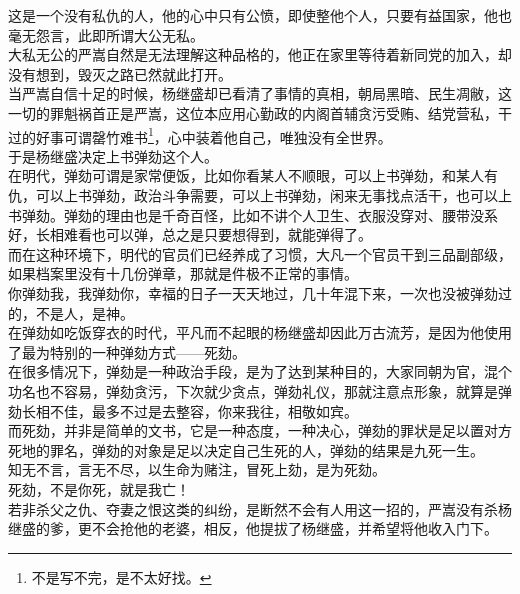 \begin{multicols}{\theparacolNo}
这是一个没有私仇的人，他的心中只有公愤，即使整他个人，只要有益国家，他也毫无怨言，此即所谓大公无私。\\

大私无公的严嵩自然是无法理解这种品格的，他正在家里等待着新同党的加入，却没有想到，毁灭之路已然就此打开。\\

当严嵩自信十足的时候，杨继盛却已看清了事情的真相，朝局黑暗、民生凋敝，这一切的罪魁祸首正是严嵩，这位本应用心勤政的内阁首辅贪污受贿、结党营私，干过的好事可谓罄竹难书\footnote{不是写不完，是不太好找。}，心中装着他自己，唯独没有全世界。\\

于是杨继盛决定上书弹劾这个人。\\

在明代，弹劾可谓是家常便饭，比如你看某人不顺眼，可以上书弹劾，和某人有仇，可以上书弹劾，政治斗争需要，可以上书弹劾，闲来无事找点活干，也可以上书弹劾。弹劾的理由也是千奇百怪，比如不讲个人卫生、衣服没穿对、腰带没系好，长相难看也可以弹，总之是只要想得到，就能弹得了。\\

而在这种环境下，明代的官员们已经养成了习惯，大凡一个官员干到三品副部级，如果档案里没有十几份弹章，那就是件极不正常的事情。\\

你弹劾我，我弹劾你，幸福的日子一天天地过，几十年混下来，一次也没被弹劾过的，不是人，是神。\\

在弹劾如吃饭穿衣的时代，平凡而不起眼的杨继盛却因此万古流芳，是因为他使用了最为特别的一种弹劾方式——死劾。\\

在很多情况下，弹劾是一种政治手段，是为了达到某种目的，大家同朝为官，混个功名也不容易，弹劾贪污，下次就少贪点，弹劾礼仪，那就注意点形象，就算是弹劾长相不佳，最多不过是去整容，你来我往，相敬如宾。\\

而死劾，并非是简单的文书，它是一种态度，一种决心，弹劾的罪状是足以置对方死地的罪名，弹劾的对象是足以决定自己生死的人，弹劾的结果是九死一生。\\

知无不言，言无不尽，以生命为赌注，冒死上劾，是为死劾。\\

死劾，不是你死，就是我亡！\\

若非杀父之仇、夺妻之恨这类的纠纷，是断然不会有人用这一招的，严嵩没有杀杨继盛的爹，更不会抢他的老婆，相反，他提拔了杨继盛，并希望将他收入门下。\\


\end{multicols}
